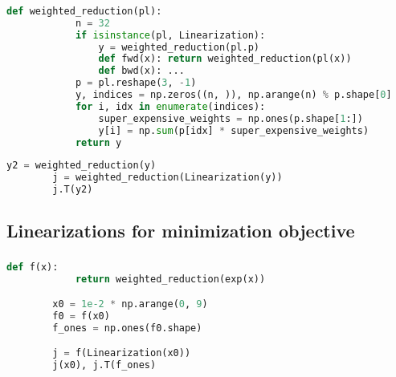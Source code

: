 \documentclass[aspectratio=169,xcolor=dvipsnames]{beamer}
\begin{document}
\begin{frame}[fragile]
	\frametitle{\insertsection}
	\framesubtitle{\insertsubsection}

	\begin{lstlisting}[language=python,escapechar=!]
		def weighted_reduction(pl):
			n = 32
			if isinstance(pl, Linearization):
				y = weighted_reduction(pl.p)
				def fwd(x): return weighted_reduction(pl(x))
				def bwd(x): ...
			p = pl.reshape(3, -1)
			y, indices = np.zeros((n, )), np.arange(n) % p.shape[0]
			for i, idx in enumerate(indices):
				super_expensive_weights = np.ones(p.shape[1:])
				y[i] = np.sum(p[idx] * super_expensive_weights)
			return y
	\end{lstlisting}

	\begin{lstlisting}[language=python,escapechar=!]
		y2 = weighted_reduction(y)
		j = weighted_reduction(Linearization(y))
		j.T(y2)
	\end{lstlisting}

\end{frame}

\subsection{Linearizations for minimization objective}
\begin{frame}[fragile]
	\frametitle{\insertsection}
	\framesubtitle{\insertsubsection}

	\begin{lstlisting}[language=python,escapechar=!]
		def f(x):
			return weighted_reduction(exp(x))

		x0 = 1e-2 * np.arange(0, 9)
		f0 = f(x0)
		f_ones = np.ones(f0.shape)

		j = f(Linearization(x0))
		j(x0), j.T(f_ones)
	\end{lstlisting}

\end{frame}
\end{document}
